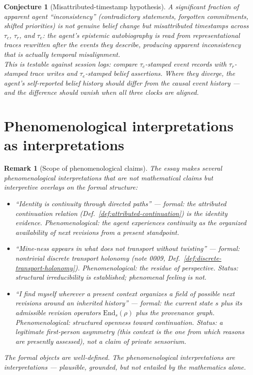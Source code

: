 \documentclass[11pt]{article}
\newtheorem{conjecture}{Conjecture}
\newtheorem{remark}{Remark}
\newcommand{\tauc}{\tau_c}
\newcommand{\taur}{\tau_r}
\newcommand{\taue}{\tau_e}
\newcommand{\End}{\mathrm{End}}
\begin{document}
\begin{conjecture}[Misattributed-timestamp hypothesis]
\label{conj:misattributed-timestamp}
A significant fraction of apparent agent ``inconsistency'' (contradictory statements,
forgotten commitments, shifted priorities) is not genuine belief change but
\emph{misattributed timestamps across $\tauc$, $\taur$, and $\taue$}: the agent's
epistemic autobiography is read from representational traces rewritten after the events
they describe, producing apparent inconsistency that is actually temporal misalignment.
\\[4pt]
This is testable against session logs: compare $\tauc$-stamped event records with
$\taur$-stamped trace writes and $\taue$-stamped belief assertions. Where they diverge,
the agent's self-reported belief history should differ from the causal event history ---
and the difference should vanish when all three clocks are aligned.
\end{conjecture}

\section{Phenomenological interpretations as interpretations}

\begin{remark}[Scope of phenomenological claims]
\label{rem:phenomenological-scope}
The essay makes several phenomenological interpretations that are not mathematical claims
but interpretive overlays on the formal structure:
\begin{itemize}
  \item ``Identity is continuity through directed paths'' --- \emph{formal}: the attributed
        continuation relation (Def.~\ref{def:attributed-continuation}) is the identity
        evidence. \emph{Phenomenological}: the agent experiences continuity as the
        organized availability of next revisions from a present standpoint.
  \item ``Mine-ness appears in what does not transport without twisting'' --- \emph{formal}:
        nontrivial discrete transport holonomy (note 0009, Def.~\ref{def:discrete-transport-holonomy}).
        \emph{Phenomenological}: the residue of perspective. \emph{Status}: structural
        irreducibility is established; phenomenal feeling is not.
  \item ``I find myself wherever a present context organizes a field of possible next
        revisions around an inherited history'' --- \emph{formal}: the current state $s$
        plus its admissible revision operators $\End_s(\rho)$ plus the provenance graph.
        \emph{Phenomenological}: structured openness toward continuation. \emph{Status}:
        a legitimate first-person asymmetry (this context is the one from which reasons
        are presently assessed), not a claim of private sensorium.
\end{itemize}
The formal objects are well-defined. The phenomenological interpretations are
interpretations --- plausible, grounded, but not entailed by the mathematics alone.
\end{remark}
\end{document}
